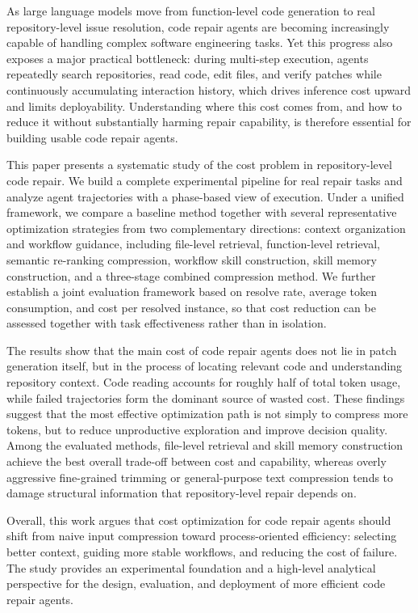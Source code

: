   \begin{abstract*}
  
  As large language models move from function-level code generation to real
  repository-level issue resolution, code repair agents are becoming increasingly
  capable of handling complex software engineering tasks. Yet this progress also
  exposes a major practical bottleneck: during multi-step execution, agents repeatedly
  search repositories, read code, edit files, and verify patches while continuously
  accumulating interaction history, which drives inference cost upward and limits
  deployability. Understanding where this cost comes from, and how to reduce it
  without substantially harming repair capability, is therefore essential for
  building usable code repair agents.

  This paper presents a systematic study of the cost problem in repository-level 
  code repair. We build a complete experimental pipeline for real repair tasks and
  analyze agent trajectories with a phase-based view of execution. Under a unified
  framework, we compare a baseline method together with several representative
  optimization strategies from two complementary directions: context organization
  and workflow guidance, including file-level retrieval, function-level retrieval,
  semantic re-ranking compression, workflow skill construction, skill memory
  construction, and a three-stage combined compression method. We further establish
  a joint evaluation framework based on resolve rate, average token consumption,
  and cost per resolved instance, so that cost reduction can be assessed together
  with task effectiveness rather than in isolation.

  The results show that the main cost of code repair agents does not lie in patch
  generation itself, but in the process of locating relevant code and understanding
  repository context. Code reading accounts for roughly half of total token usage,
  while failed trajectories form the dominant source of wasted cost. These findings
  suggest that the most effective optimization path is not simply to compress more
  tokens, but to reduce unproductive exploration and improve decision quality.
  Among the evaluated methods, file-level retrieval and skill memory construction
  achieve the best overall trade-off between cost and capability, whereas overly
  aggressive fine-grained trimming or general-purpose text compression tends to
  damage structural information that repository-level repair depends on.

  Overall, this work argues that cost optimization for code repair agents should
  shift from naive input compression toward process-oriented efficiency: selecting
  better context, guiding more stable workflows, and reducing the cost of failure.
  The study provides an experimental foundation and a high-level analytical
  perspective for the design, evaluation, and deployment of more efficient code
  repair agents.
  
  
  \end{abstract*}
  

